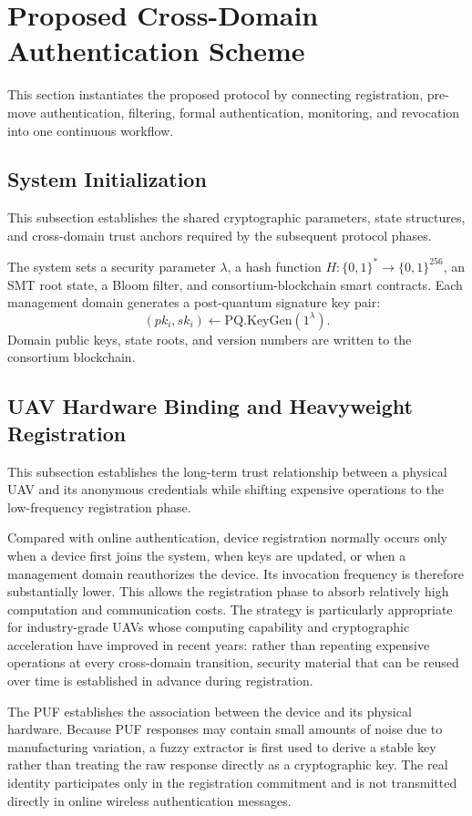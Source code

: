 \documentclass[lettersize,journal]{IEEEtran}
\begin{document}
	\section{Proposed Cross-Domain Authentication Scheme}
	This section instantiates the proposed protocol by connecting registration, pre-move authentication, filtering, formal authentication, monitoring, and revocation into one continuous workflow.
	
	
	\subsection{System Initialization}
	This subsection establishes the shared cryptographic parameters, state structures, and cross-domain trust anchors required by the subsequent protocol phases.
	
	
	The system sets a security parameter $\lambda$, a hash function $H:\{0,1\}^{*}\rightarrow\{0,1\}^{256}$, an SMT root state, a Bloom filter, and consortium-blockchain smart contracts. Each management domain generates a post-quantum signature key pair:
	\begin{equation}
		(pk_i,sk_i)\leftarrow \mathrm{PQ.KeyGen}(1^\lambda).
	\end{equation}
	Domain public keys, state roots, and version numbers are written to the consortium blockchain.
	
	\subsection{UAV Hardware Binding and Heavyweight Registration}
	This subsection establishes the long-term trust relationship between a physical UAV and its anonymous credentials while shifting expensive operations to the low-frequency registration phase.
	
	
	Compared with online authentication, device registration normally occurs only when a device first joins the system, when keys are updated, or when a management domain reauthorizes the device. Its invocation frequency is therefore substantially lower. This allows the registration phase to absorb relatively high computation and communication costs. The strategy is particularly appropriate for industry-grade UAVs whose computing capability and cryptographic acceleration have improved in recent years: rather than repeating expensive operations at every cross-domain transition, security material that can be reused over time is established in advance during registration.
	
	The PUF establishes the association between the device and its physical hardware. Because PUF responses may contain small amounts of noise due to manufacturing variation, a fuzzy extractor is first used to derive a stable key rather than treating the raw response directly as a cryptographic key. The real identity participates only in the registration commitment and is not transmitted directly in online wireless authentication messages.
	
\end{document}
